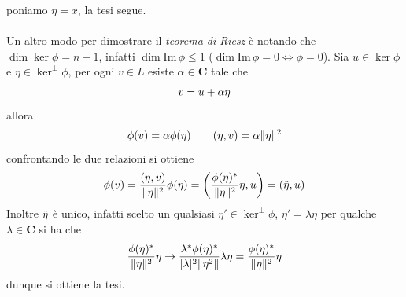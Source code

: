 \documentclass{article}
\begin{document}
poniamo $\eta = x$, la tesi segue. \\ \\
Un altro modo per dimostrare il \textit{teorema di Riesz} è notando che $\dim \ker \phi = n - 1$, infatti $\dim \mathrm{Im} \, \phi \leq 1$ ($\dim \mathrm{Im} \, \phi = 0 \iff \phi = 0$). Sia $u \in \ker \phi$ e $\eta \in \ker^\perp \phi$, per ogni $v \in L$ esiste $\alpha \in \mathbf{C}$ tale che
\begin{gather}
    v = u + \alpha\eta \notag
\end{gather}
allora
\begin{gather}
    \phi(v) = \alpha\phi(\eta) \qquad (\eta, v) = \alpha\|\eta\|^2 \notag
\end{gather}
confrontando le due relazioni si ottiene
\begin{gather}
    \phi(v) = \frac{(\eta, v)}{\|\eta\|^2}\phi(\eta) = \left( \frac{\phi(\eta)^*}{\|\eta\|^2}\eta, u \right) = (\Tilde{\eta}, u) \notag
\end{gather}
Inoltre $\Tilde{\eta}$ è unico, infatti scelto un qualsiasi $\eta' \in \ker^\perp \phi$, $\eta' = \lambda \eta$ per qualche $\lambda \in \mathbf{C}$ si ha che
\begin{gather}
    \frac{\phi(\eta)^*}{\|\eta\|^2}\eta \rightarrow \frac{\lambda^*\phi(\eta)^*}{|\lambda|^2\|\eta^2\|}\lambda\eta = \frac{\phi(\eta)^*}{\|\eta\|^2}\eta \notag
\end{gather}
dunque si ottiene la tesi.

\newpage
\end{document}
